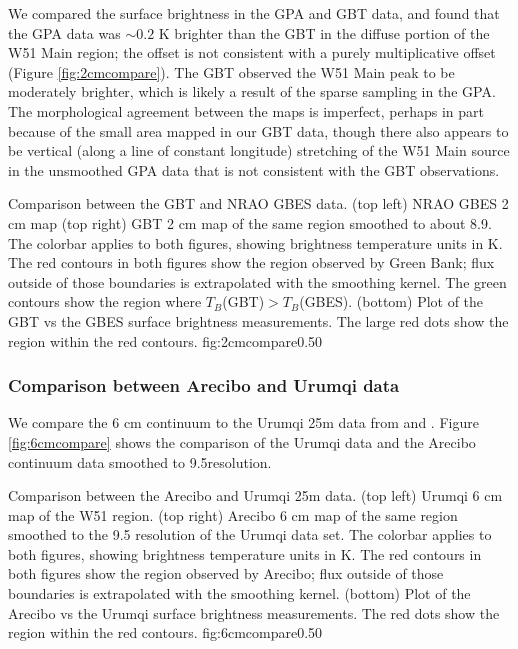 We compared the surface brightness in the GPA and GBT data, and found that the
GPA data was $\sim0.2$ K brighter than the GBT in the diffuse portion of the
W51 Main region; the offset is not consistent with a purely multiplicative
offset (Figure \ref{fig:2cmcompare}).  The GBT observed the W51 Main peak to be
moderately brighter, which is likely a result of the sparse sampling in the
GPA.  The morphological agreement between the maps is imperfect, perhaps in
part because of the small area mapped in our GBT data, though there also
appears to be vertical (along a line of constant longitude) stretching of the
W51 Main source in the unsmoothed GPA data that is not consistent with the GBT
observations.

{Comparison between the GBT and NRAO GBES \citep{Langston2000a} data.
(top left) NRAO GBES 2 cm map
(top right) GBT 2 cm map of the same region smoothed to about 8.9\arcmin. 
The colorbar applies to both figures,
showing brightness temperature units in K.  The red contours in both figures
show the region observed by Green Bank; flux outside of those boundaries is
extrapolated with the smoothing kernel.  The green contours show the region
where $T_B$(GBT)$>T_B$(GBES).  (bottom) Plot of the GBT vs the GBES surface
brightness measurements.
The large red dots show the region within the red contours.  
}
{fig:2cmcompare}{0.5}{0}

\subsubsection{Comparison between Arecibo and Urumqi data}
We compare the 6 cm continuum to the Urumqi 25m data from \citet{Sun2007a} and
\citet{Sun2011a}.  Figure \ref{fig:6cmcompare} shows the comparison of the
Urumqi data and the Arecibo continuum data smoothed to 9.5\arcmin resolution.


{Comparison between the Arecibo and Urumqi 25m \citep{Sun2011b} data.
(top left) Urumqi 6 cm map of the W51 region.
(top right) Arecibo 6 cm map of the same region smoothed to the 9.5\arcmin
resolution of the Urumqi data set.  The colorbar applies to both figures,
showing brightness temperature units in K.  The red contours in both figures
show the region observed by Arecibo; flux outside of those boundaries is
extrapolated with the smoothing kernel. 
(bottom) Plot of the Arecibo vs the Urumqi surface brightness measurements.
The red dots show the region within the red contours.
}
{fig:6cmcompare}{0.5}{0}


